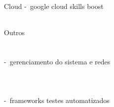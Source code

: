 \documentclass{article}
\begin{document}
\begin{skillgroup}{Cloud}%
	 -\ google cloud skills boost\\
	\\
\end{skillgroup}

\begin{skillgroup}{Outros}%
	\\
	\\
	\\
	 -\ gerenciamento do sistema e redes\\
	\\
	\\
	\\
	 -\ frameworks testes automatizados\\
\end{skillgroup}







\end{document}
